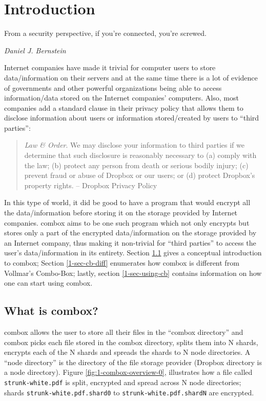 \chapter{Introduction}

\epigraph{From a security perspective, if you're connected, you're
  screwed.}{\textit{Daniel J. Bernstein}}

Internet companies have made it trivial for computer users to store
data/information on their servers and at the same time there is a lot
of evidence of governments and other powerful organizations being able
to access information/data stored on the Internet companies'
computers\cite{website:wikileaks-spyfiles}. Also, most companies add a
standard clause in their privacy policy that allows them to disclose
information about users or information stored/created by users to
``third parties'':

\begin{quote}
  \emph{Law \& Order}. We may disclose your information to third
  parties if we determine that such disclosure is reasonably necessary
  to (a) comply with the law; (b) protect any person from death or
  serious bodily injury; (c) prevent fraud or abuse of Dropbox or our
  users; or (d) protect Dropbox's property rights. -- Dropbox Privacy
  Policy\cite{website:dropbox-privacy}
\end{quote}

In this type of world, it did be good to have a program that would
encrypt all the data/information before storing it on the storage
provided by Internet companies. combox aims to be one such program
which not only encrypts but stores only a part of the encrypted
data/information on the storage provided by an Internet company, thus
making it non-trivial for ``third parties'' to access the user's
data/information in its entirety. Section \ref{1-sec-cb} gives a conceptual
introduction to combox; Section \ref{1-sec-cb-diff} enumerates how
combox is different from Vollmar's Combo-Box; lastly, section
\ref{1-sec-using-cb} contains information on how one can start using
combox.

\section{What is combox?}\label{1-sec-cb}

combox allows the user to store all their  files in the ``combox
directory'' and combox picks each file stored in the combox directory,
splits them into N shards, encrypts each of the N shards and spreads
the shards to N node directories. A ``node directory'' is the
directory of the file storage provider (Dropbox directory is a node
directory). Figure \ref{fig:1-combox-overview-0}, illustrates how a file
called \verb+strunk-white.pdf+ is split, encrypted and spread across
N node directories; shards \verb+strunk-white.pdf.shard0+ to
\verb+strunk-white.pdf.shardN+ are encrypted.

